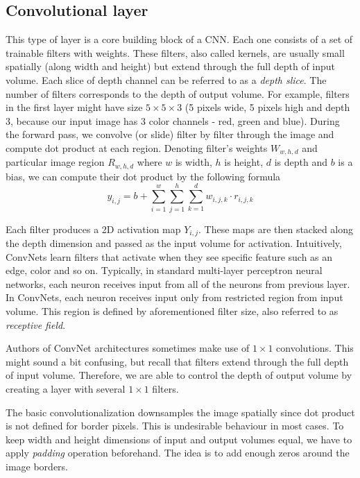 \subsection{Convolutional layer}
\label{sec:cnn:convlayer}

This type of layer is a core building block of a CNN.
Each one consists of a set of trainable filters with weights. These filters, also
called kernels,
are usually small spatially (along width and height) but extend through the full depth
of input volume. Each slice of depth channel can be referred to as a \textit{depth slice}. 
The number of filters corresponds to the depth of output volume.
For example, filters in the first layer might have size $5\times5\times3$
(5 pixels wide, 5 pixels high and depth 3, because our input image has 3 color
channels - red, green and blue). During the forward pass, we convolve (or slide) filter by filter through
the image and compute dot product at each region.
Denoting filter's weights $W_{w,h,d}$ and particular image region $R_{w,h,d}$ where
$w$ is width, $h$ is height, $d$ is depth and $b$ is a bias, we can compute
their dot product by the following formula
$$y_{i,j} = b + \sum_{i=1}^{w}\sum_{j=1}^{h}\sum_{k=1}^{d}w_{i,j,k}\cdot r_{i,j,k}$$

Each filter produces a 2D activation map $Y_{i,j}$.
These maps are then stacked along the depth dimension and passed as the input volume for
activation.
Intuitively, ConvNets learn filters that activate when they see specific feature such
as an edge, color and so on. Typically, in standard multi-layer perceptron
neural networks, each neuron
receives input from all of the neurons from previous layer. In ConvNets, each neuron
receives input only from restricted region from input volume. This region is defined
by aforementioned filter size, also referred to as \textit{receptive field}.

Authors of ConvNet architectures sometimes make use of $1\times 1$ convolutions.
This might sound
a bit confusing, but recall that filters extend through the full depth of input volume.
Therefore, we are able to control the depth of output volume by creating a layer with several
$1\times 1$ filters.

The basic convolutionalization downsamples the image spatially since dot product is not
defined for border pixels. This is undesirable behaviour in most cases. To keep width
and height dimensions of input and output volumes equal, we have to apply \textit{padding}
operation beforehand. The idea is to add enough zeros around the image borders.

